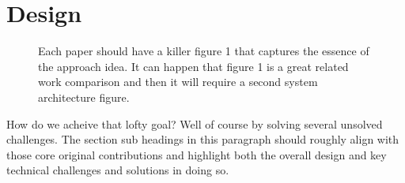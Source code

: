 \section{Design}
  \begin{figure}
    \begin{center}
    \end{center}
    \caption{\label{fig:vectors} Each paper should have a killer
    figure 1 that captures the essence of the approach idea. It
    can happen that figure 1 is a great related work comparison
    and then it will require a second system architecture
    figure.}
  \end{figure}

  How do we acheive that lofty goal? 
  Well of course by solving several unsolved challenges.
  The section sub headings in this paragraph should roughly
  align with those core original contributions and highlight
  both the overall design and key technical challenges and
  solutions in doing so.

